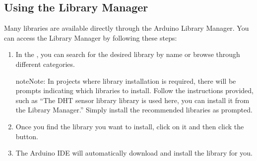 \documentclass[a4paper,11pt,english]{sphinxmanual}
\begin{document}
\subsection{Using the Library Manager}
\label{\detokenize{Get_Started_with_Arduino/How_to_add_Libraries:using-the-library-manager}}
\sphinxAtStartPar
Many libraries are available directly through the Arduino Library Manager. You can access the Library Manager by following these steps:
\begin{enumerate}
%
\item {} 
\sphinxAtStartPar
In the , you can search for the desired library by name or browse through different categories.

\begin{sphinxadmonition}{note}{Note:}
\sphinxAtStartPar
In projects where library installation is required, there will be prompts indicating which libraries to install. Follow the instructions provided, such as “The DHT sensor library library is used here, you can install it from the Library Manager.” Simply install the recommended libraries as prompted.
\end{sphinxadmonition}

\noindent{}

\item {} 
\sphinxAtStartPar
Once you find the library you want to install, click on it and then click the  button.

\noindent{}

\item {} 
\sphinxAtStartPar
The Arduino IDE will automatically download and install the library for you.

\end{enumerate}
\end{document}
